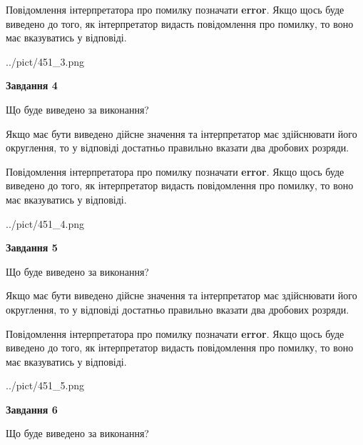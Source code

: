 \documentclass[12pt, ukrainian]{article}
\begin{document}
{\begin {Large}
Повідомлення інтерпретатора про помилку позначати \textbf{error}.
Якщо щось буде виведено до того, як інтерпретатор видасть повідомлення про помилку, 
то воно має вказуватись у відповіді. \par

\begin{center}
	{../pict/451_3.png}
\end{center}
\newpage

{\begin {center}\textbf{Завдання 4}\end {center}}\par
Що буде виведено за виконання? \par

Якщо має бути виведено дійсне значення та інтерпретатор має здійснювати його округлення, 
то у відповіді достатньо правильно вказати два дробових розряди.

Повідомлення інтерпретатора про помилку позначати \textbf{error}.
Якщо щось буде виведено до того, як інтерпретатор видасть повідомлення про помилку, 
то воно має вказуватись у відповіді. \par

\begin{center}
	{../pict/451_4.png}
\end{center}
\newpage

{\begin {center}\textbf{Завдання 5}\end {center}}\par
Що буде виведено за виконання? \par

Якщо має бути виведено дійсне значення та інтерпретатор має здійснювати його округлення, 
то у відповіді достатньо правильно вказати два дробових розряди.

Повідомлення інтерпретатора про помилку позначати \textbf{error}.
Якщо щось буде виведено до того, як інтерпретатор видасть повідомлення про помилку, 
то воно має вказуватись у відповіді. \par

\begin{center}
	{../pict/451_5.png}
\end{center}
\newpage

{\begin {center}\textbf{Завдання 6}\end {center}}\par
Що буде виведено за виконання? \par


\end{Large}}
\end{document}
